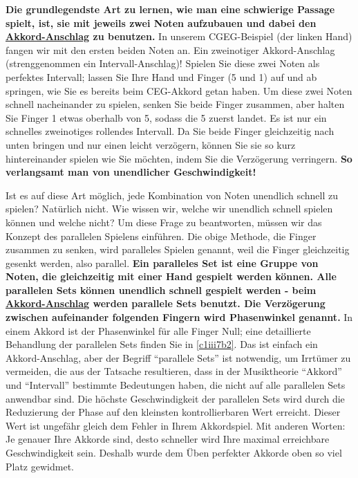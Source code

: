 \textbf{Die grundlegendste Art zu lernen, wie man eine schwierige Passage spielt, ist, sie mit jeweils zwei Noten aufzubauen und dabei den \hyperref[c1ii9]{Akkord-Anschlag} zu benutzen.} In unserem CGEG-Beispiel (der linken Hand) fangen wir mit den ersten beiden Noten an.
Ein zweinotiger Akkord-Anschlag (strenggenommen ein Intervall-Anschlag)!
Spielen Sie diese zwei Noten als perfektes Intervall; lassen Sie Ihre Hand und Finger (5 und 1) auf und ab springen, wie Sie es bereits beim CEG-Akkord getan haben.
Um diese zwei Noten schnell nacheinander zu spielen, senken Sie beide Finger zusammen, aber halten Sie Finger 1 etwas oberhalb von 5, sodass die 5 zuerst landet.
Es ist nur ein schnelles zweinotiges rollendes Intervall.
Da Sie beide Finger gleichzeitig nach unten bringen und nur einen leicht verzögern, können Sie sie so kurz hintereinander spielen wie Sie möchten, indem Sie die Verzögerung verringern.
\textbf{So verlangsamt man von unendlicher Geschwindigkeit!}

Ist es auf diese Art möglich, jede Kombination von Noten unendlich schnell zu spielen? Natürlich nicht.
Wie wissen wir, welche wir unendlich schnell spielen können und welche nicht?
Um diese Frage zu beantworten, müssen wir das Konzept des parallelen Spielens einführen.
Die obige Methode, die Finger zusammen zu senken, wird paralleles Spielen genannt, weil die Finger gleichzeitig gesenkt werden, also parallel.
\textbf{Ein paralleles Set ist eine Gruppe von Noten, die gleichzeitig mit einer Hand gespielt werden können.
Alle parallelen Sets können unendlich schnell gespielt werden - beim \hyperref[c1ii9]{Akkord-Anschlag} werden parallele Sets benutzt.
Die Verzögerung zwischen aufeinander folgenden Fingern wird Phasenwinkel genannt.}
In einem Akkord ist der Phasenwinkel für alle Finger Null; eine detaillierte Behandlung der parallelen Sets finden Sie in \hyperref[c1iii7b2]{\autoref{c1iii7b2}}.
Das ist einfach ein Akkord-Anschlag, aber der Begriff \enquote{parallele Sets} ist notwendig, um Irrtümer zu vermeiden, die aus der Tatsache resultieren, dass in der Musiktheorie \enquote{Akkord} und \enquote{Intervall} bestimmte Bedeutungen haben, die nicht auf alle parallelen Sets anwendbar sind.
Die höchste Geschwindigkeit der parallelen Sets wird durch die Reduzierung der Phase auf den kleinsten kontrollierbaren Wert erreicht.
Dieser Wert ist ungefähr gleich dem Fehler in Ihrem Akkordspiel.
Mit anderen Worten: Je genauer Ihre Akkorde sind, desto schneller wird Ihre maximal erreichbare Geschwindigkeit sein.
Deshalb wurde dem Üben perfekter Akkorde oben so viel Platz gewidmet.

